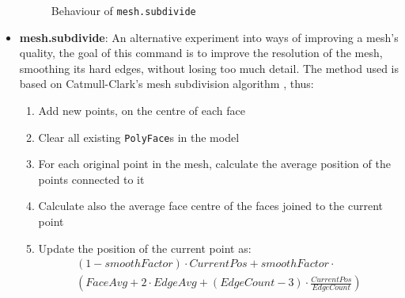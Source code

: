 \documentclass[a4paper,10pt]{article}
\begin{document}
\begin{itemize}
\begin{figure}
  \begin{center}
  \hspace{-10px}
  \caption{Behaviour of \texttt{mesh.subdivide}}
  \label{subdiv}
  \end{center}
\end{figure}

\item{\textbf{mesh.subdivide}: An alternative experiment into ways of improving a mesh's quality, the goal of this command is to improve the resolution of the mesh, smoothing its hard edges, without losing too much detail. The method used is based on Catmull-Clark's mesh subdivision algorithm \cite{catmull}, thus:
\begin{enumerate}
\item{Add new points, on the centre of each face}
\item{Clear all existing \texttt{PolyFace}s in the model}
\item{For each original point in the mesh, calculate the average position of the points connected to it}
\item{Calculate also the average face centre of the faces joined to the current point}
\item{Update the position of the current point as:
\begin{eqnarray*}
 (1 - smoothFactor) \cdot CurrentPos + smoothFactor \cdot \\ \left(FaceAvg + 2 \cdot EdgeAvg + (EdgeCount-3) \cdot \frac{CurrentPos}{EdgeCount}\right)
\end{eqnarray*}
}


\end{enumerate}}
\end{itemize}
\end{document}
